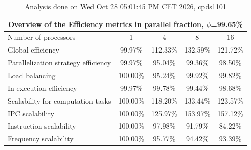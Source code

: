 \begin{table}[h]
\begin{center}
\begin{tabular}{|l|c|c|c|c|}
\hline
\multicolumn{5}{|c|}{Overview of the Efficiency metrics in parallel fraction, $\phi$=99.65\%} \\
\hline
\hline
Number of processors & 1 & 4 & 8 & 16 \\
\hline
\hline
Global efficiency                      &     99.97\% &    112.33\% &    132.59\% &    121.72\% \\
\hline
\hline
Parallelization strategy efficiency &     99.97\% &     95.04\% &     99.36\% &     98.50\% \\
\hline
Load balancing                   &    100.00\% &     95.24\% &     99.92\% &     99.82\% \\
In execution efficiency          &     99.97\% &     99.78\% &     99.44\% &     98.68\% \\
\hline
\hline
Scalability for computation tasks   &    100.00\% &    118.20\% &    133.44\% &    123.57\% \\
\hline
IPC scalability                  &    100.00\% &    125.97\% &    153.97\% &    157.12\% \\
Instruction scalability          &    100.00\% &     97.98\% &     91.79\% &     84.22\% \\
Frequency scalability            &    100.00\% &     95.77\% &     94.42\% &     93.39\% \\
\hline
\end{tabular}
\end{center}
\caption{ Analysis done on Wed Oct 28 05:01:45 PM CET 2026, cpds1101}
\end{table}
